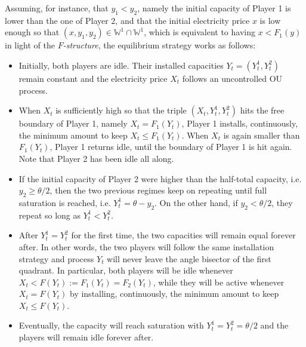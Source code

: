 \documentclass[10pt]{article}
\numberwithin{equation}{section}
\theoremstyle{plain}
\numberwithin{theorem}{section}
\theoremstyle{definition}
\newcommand{\<}{\langle}
\renewcommand{\>}{\rangle}
\renewcommand{\(}{\left(}
\renewcommand{\)}{\right)}
\begin{document}
{Assuming, for instance, that $y_1<y_2$, namely the initial capacity of Player 1 is lower than the one of Player 2, and that the initial electricity price $x$ is low enough so that $(x,y_1,y_2)\in \mathbb{W}^1 \cap \mathbb{W}^1$, which is equivalent to having $x < F_1(y)$ in light of the \emph{$F$-structure}, the equilibrium strategy works as follows:
\begin{itemize}
\item[-] Initially, both players are idle. Their installed capacities $Y_t =( Y^1_t , Y^2_t)$ remain constant and the electricity price $X_t$ follows an uncontrolled OU process. 
\item[-] When $X_t$ is sufficiently high so that the triple $(X_t, Y^1_t , Y^2_t)$ hits the free boundary of Player 1, namely $X_t = F_1 (Y_t)$, Player 1 installs, continuously, the minimum amount to keep $X_t \leq F_1 (Y_t)$. When $X_t$ is again smaller than $F_1(Y_t)$, Player 1 returns idle, until the boundary of Player 1 is hit again. Note that Player 2 has been idle all along.
\item[-] If the initial capacity of Player 2 were higher than the half-total capacity, i.e. $y_2 \geq \theta/2$, then the two previous regimes keep on repeating until full saturation is reached, i.e. $Y^1_t = \theta - y_2$. On the other hand, if $y_2 < \theta/2$, they repeat so long as $Y^1_t < Y^2_t$.
\item[-] After $Y^1_t = Y^2_t$ for the first time, the two capacities will remain equal forever after. In other words, the two players will follow the same installation strategy and process $Y_t$ will never leave the angle bisector of the first quadrant. In particular, both players will be idle whenever $X_t < F(Y_t) := F_1(Y_t) = F_2(Y_t)$, while they will be active whenever $X_t  = F(Y_t)$ by installing, continuously, the minimum amount to keep $X_t \leq F(Y_t)$.
\item[-] Eventually, the capacity will reach saturation with $Y^1_t = Y^2_t = \theta/2$ and the players will remain idle forever after.
\end{itemize}



}
\end{document}
